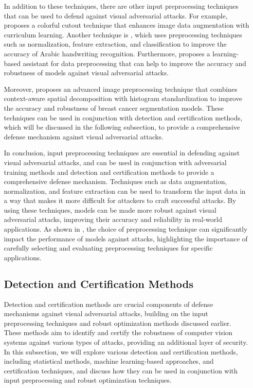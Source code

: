 \documentclass[11pt]{article}
\begin{document}
In addition to these techniques, there are other input preprocessing techniques that can be used to defend against visual adversarial attacks. For example, \cite{ref110} proposes a colorful cutout technique that enhances image data augmentation with curriculum learning. Another technique is \cite{ref111}, which uses preprocessing techniques such as normalization, feature extraction, and classification to improve the accuracy of Arabic handwriting recognition. Furthermore, \cite{ref112} proposes a learning-based assistant for data preprocessing that can help to improve the accuracy and robustness of models against visual adversarial attacks.

Moreover, \cite{ref113} proposes an advanced image preprocessing technique that combines context-aware spatial decomposition with histogram standardization to improve the accuracy and robustness of breast cancer segmentation models. These techniques can be used in conjunction with detection and certification methods, which will be discussed in the following subsection, to provide a comprehensive defense mechanism against visual adversarial attacks.

In conclusion, input preprocessing techniques are essential in defending against visual adversarial attacks, and can be used in conjunction with adversarial training methods and detection and certification methods to provide a comprehensive defense mechanism. Techniques such as data augmentation, normalization, and feature extraction can be used to transform the input data in a way that makes it more difficult for attackers to craft successful attacks. By using these techniques, models can be made more robust against visual adversarial attacks, improving their accuracy and reliability in real-world applications. As shown in \cite{ref114}, the choice of preprocessing technique can significantly impact the performance of models against attacks, highlighting the importance of carefully selecting and evaluating preprocessing techniques for specific applications.

\subsection{Detection and Certification Methods}

Detection and certification methods are crucial components of defense mechanisms against visual adversarial attacks, building on the input preprocessing techniques and robust optimization methods discussed earlier. These methods aim to identify and certify the robustness of computer vision systems against various types of attacks, providing an additional layer of security. In this subsection, we will explore various detection and certification methods, including statistical methods, machine learning-based approaches, and certification techniques, and discuss how they can be used in conjunction with input preprocessing and robust optimization techniques.
\end{document}
